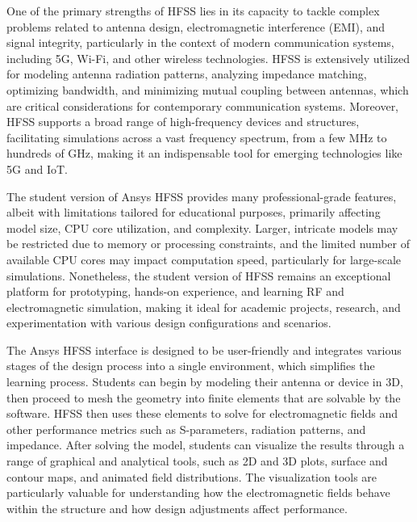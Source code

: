 \documentclass[12pt]{article}
\begin{document}
\par One of the primary strengths of HFSS lies in its capacity to tackle complex problems related to antenna design, electromagnetic interference (EMI), and signal integrity, particularly in the context of modern communication systems, including 5G, Wi-Fi, and other wireless technologies. HFSS is extensively utilized for modeling antenna radiation patterns, analyzing impedance matching, optimizing bandwidth, and minimizing mutual coupling between antennas, which are critical considerations for contemporary communication systems. Moreover, HFSS supports a broad range of high-frequency devices and structures, facilitating simulations across a vast frequency spectrum, from a few MHz to hundreds of GHz, making it an indispensable tool for emerging technologies like 5G and IoT.\\

\par The student version of Ansys HFSS provides many professional-grade features, albeit with limitations tailored for educational purposes, primarily affecting model size, CPU core utilization, and complexity. Larger, intricate models may be restricted due to memory or processing constraints, and the limited number of available CPU cores may impact computation speed, particularly for large-scale simulations. Nonetheless, the student version of HFSS remains an exceptional platform for prototyping, hands-on experience, and learning RF and electromagnetic simulation, making it ideal for academic projects, research, and experimentation with various design configurations and scenarios.\\

\par The Ansys HFSS interface is designed to be user-friendly and integrates various stages of the design process into a single environment, which simplifies the learning process. Students can begin by modeling their antenna or device in 3D, then proceed
to mesh the geometry into finite elements that are solvable by the software. HFSS then uses these elements to solve for electromagnetic fields and other performance
metrics such as S-parameters, radiation patterns, and impedance. After solving the model, students can visualize the results through a range of graphical
and analytical tools, such as 2D and 3D plots, surface and contour maps, and animated field distributions. The visualization tools are particularly valuable for
understanding how the electromagnetic fields behave within the structure and how design adjustments affect performance.\\
\end{document}
